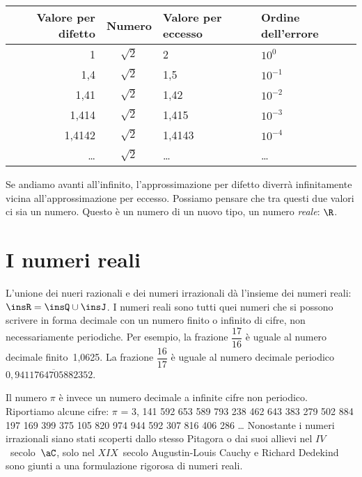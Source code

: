 \begin{center}
 \begin{tabular}{rcll}
\toprule
Valore per difetto & Numero &Valore per eccesso & Ordine dell'errore\\
\midrule
1 & \(\sqrt{2}\)  & 2  & \(10^{0}\)\\
1,4 & \(\sqrt{2}\) & 1,5  & \(10^{-1}\)\\
1,41 & \(\sqrt{2}\) & 1,42 & \(10^{-2}\)\\
1,414 & \(\sqrt{2}\) &1,415 & \(10^{-3}\)\\
1,4142 & \(\sqrt{2}\) & 1,4143 & \(10^{-4}\)\\
\ldots & \(\sqrt{2}\) & \ldots & \ldots\\
\bottomrule
\end{tabular}
\end{center}

Se andiamo avanti all'infinito, l'approssimazione per difetto diverrà 
infinitamente vicina all'approssimazione per eccesso. 
Possiamo pensare che tra questi due valori ci sia un numero. Questo è un 
numero di un nuovo tipo, un numero \emph{reale}: \(\R\).

\section{I numeri reali}
\label{sec:radicali_reali}

L'unione dei nueri razionali e dei numeri irrazionali dà l'insieme dei 
numeri reali: \(\insR=\insQ \cup \insJ\).
I numeri reali sono tutti quei numeri che si possono scrivere in forma 
decimale con un numero finito o infinito di cifre, non necessariamente 
periodiche.
Per esempio, la frazione \(\dfrac{17}{16}\) è uguale al numero decimale 
finito~1,0625.
La frazione \(\dfrac{16}{17}\) è uguale al numero decimale periodico 
\(0,\overline{9411764705882352}\).

Il numero \(\pi\) è invece un numero decimale a infinite cifre non periodico. 
Riportiamo alcune cifre:
\(\pi \) = 3, 141 592 653 589 793 238 462 643 383 279 502 884 197 169 399 375 
105 820 974 944 592 307 816 406 286
\ldots 
Nonostante i numeri irrazionali siano stati scoperti dallo stesso Pitagora o 
dai suoi allievi nel \(IV\)~secolo~\(\aC\), solo nel \(XIX\)~secolo Augustin-Louis 
Cauchy e Richard Dedekind sono giunti a una formulazione rigorosa di numeri 
reali.

